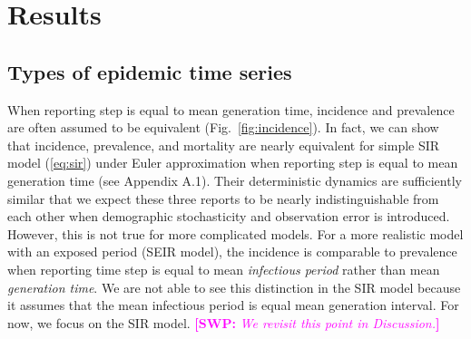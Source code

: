 \documentclass{article}
\newcommand{\eref}[1]{(\ref{eq:#1})}
\newcommand{\fref}[1]{Fig.~\ref{fig:#1}}
\newcommand{\comment}[3]{\textcolor{#1}{\textbf{[#2: }\textsl{#3}\textbf{]}}}
\newcommand{\swp}[1]{\comment{magenta}{SWP}{#1}}
\begin{document}
\section{Results}

\subsection{Types of epidemic time series}

When reporting step is equal to mean generation time, incidence and prevalence are often assumed to be equivalent (\fref{incidence}).
In fact, we can show that incidence, prevalence, and mortality are nearly equivalent for simple SIR model \eref{sir} under Euler approximation when reporting step is equal to mean generation time (see Appendix A.1).
Their deterministic dynamics are sufficiently similar that we expect these three reports to be nearly indistinguishable from each other when demographic stochasticity and observation error is introduced.
However, this is not true for more complicated models.
For a more realistic model with an exposed period (SEIR model), the incidence is comparable to prevalence when reporting time step is equal to mean \emph{infectious period} rather than mean \emph{generation time}.
We are not able to see this distinction in the SIR model because it assumes that the mean infectious period is equal mean generation interval.
For now, we focus on the SIR model. 
\swp{We revisit this point in Discussion.}
\end{document}
